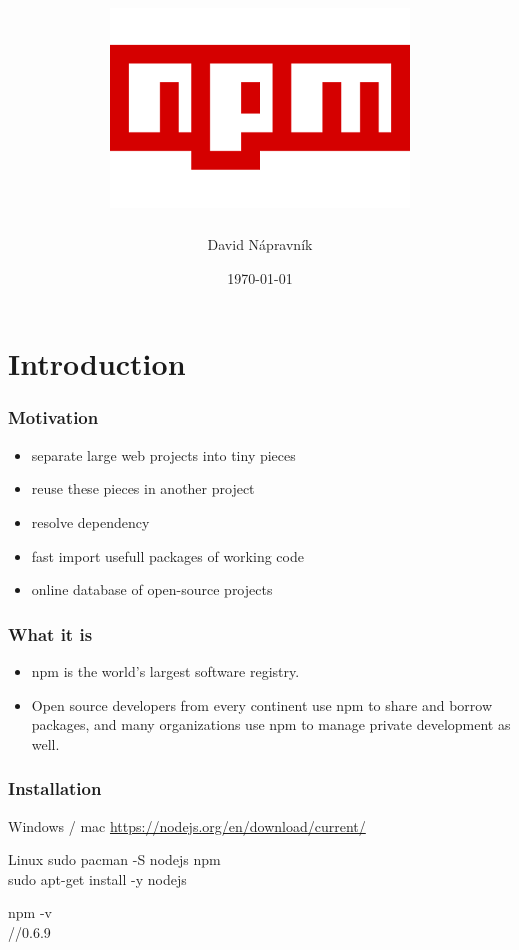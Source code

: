 \documentclass{beamer}
\title[Short title]{
	\includegraphics[scale=0.4]{npm_logo}	
} %
\author{David Nápravník} %
\institute[mff] %
{
Charles University \\ %
\medskip
\textit{ebrithil@nogare.cz} %
}
\date{\today} %
\begin{document}
\begin{frame}
\titlepage %
\end{frame}


\section{Introduction}

\begin{frame}
\frametitle{Motivation}
\begin{itemize}
\item separate large web projects into tiny pieces
\item reuse these pieces in another project
\item resolve dependency
\item fast import usefull packages of working code
\item online database of open-source projects
\end{itemize}


\end{frame}

\begin{frame}
\frametitle{What it is}
\begin{itemize}
\item npm is the world’s largest software registry.
\item Open source developers from every continent use npm to share
and borrow packages, and many organizations use npm
to manage private development as well.
\end{itemize}
\end{frame}

\begin{frame}
\frametitle{Installation}
\begin{block}{Windows / mac}
\url{https://nodejs.org/en/download/current/}
\end{block}

\begin{block}{Linux}
sudo pacman -S nodejs npm\\
sudo apt-get install -y nodejs	
\end{block}

\begin{example}[verify]
npm -v\\
//0.6.9
\end{example}

\end{frame}
\end{document}
